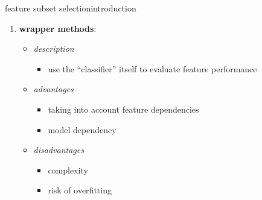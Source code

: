 		\begin{frame}{feature subset selection}{introduction}
            \vspace{-3mm}
			\begin{enumerate}
				\item	\textbf{wrapper methods}:
                    \begin{itemize}
                        \item \textit{description}
                            \begin{itemize}
                                \item  use the ``classifier'' itself to evaluate feature performance
                            \end{itemize}
                         \item \textit{advantages}
                            \begin{itemize}
                                \item   taking into account feature dependencies
                                \item   model dependency
                            \end{itemize}
                         \item \textit{disadvantages}
                            \begin{itemize}
                                \item   complexity
                                \item   risk of overfitting
                            \end{itemize}
                  \end{itemize}
				

\end{enumerate}
\end{frame}

